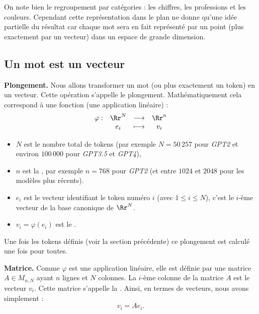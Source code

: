 \documentclass[11pt,class=report,crop=false]{standalone}
\begin{document}
On note bien le regroupement par catégories : les chiffres, les professions et les couleurs.
Cependant cette représentation dans le plan ne donne qu'une idée partielle du résultat car chaque mot sera en fait représenté par un point (plus exactement par un vecteur) dans un espace de grande dimension.



\subsection{Un mot est un vecteur}

\textbf{Plongement.}
Nous allons transformer un mot (ou plus exactement un token) en un vecteur.
Cette opération s'appelle le plongement.
Mathématiquement cela correspond à une fonction (une application linéaire) :
$$
\begin{array}{rccc}
	\varphi : & \Rr^N & \longrightarrow & \Rr^n \\
	          & e_i   & \longmapsto     & v_i  
\end{array}
$$

\begin{itemize}
	\item $N$ est le nombre total de tokens (par exemple $N=50\,257$ pour \emph{GPT2} et environ $100\,000$ pour \emph{GPT3.5} et \emph{GPT4}),
	
	\item $n$ est la , par exemple $n=768$ pour \emph{GPT2} (et entre $1024$ et $2048$ pour les modèles plus récents).
	
	\item $e_i$ est le vecteur identifiant le token numéro $i$ (avec $1 \le i \le N$), c'est le $i$-ème vecteur de la base canonique de $\Rr^N$.
	
	\item $v_i = \varphi(e_i)$ est le .
\end{itemize}


Une fois les tokens définis (voir la section précédente) ce plongement est calculé une fois pour toutes.



\medskip

\textbf{Matrice.} Comme $\varphi$ est une application linéaire, elle est définie par une matrice $A \in M_{n,N}$ ayant $n$ lignes et $N$ colonnes.
La $i$-ème colonne de la matrice $A$ est le vecteur $v_i$. Cette matrice s'appelle la .
Ainsi, en termes de vecteurs, nous avons simplement :
$$v_i =  A e_i.$$
\end{document}
